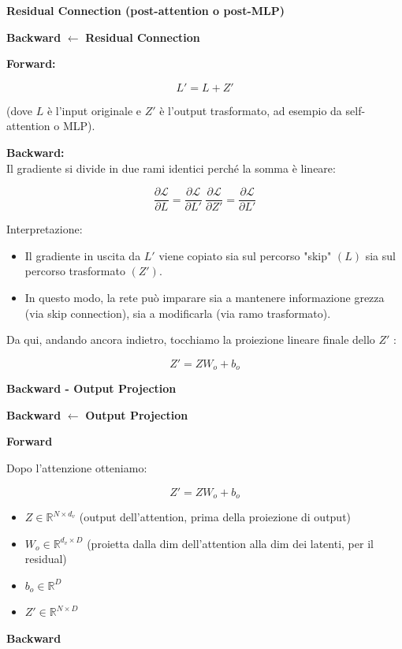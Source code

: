 \documentclass[
  11pt,
]{article}
\newcommand{\currentstep}[1]{%
\begin{tcolorbox}[colback=red!3, colframe=red!40!black, boxrule=0.3pt, arc=2pt,
  left=4pt, right=4pt, top=2pt, bottom=2pt]
{\footnotesize\textbf{Backward} $\longleftarrow$ \textbf{#1}}
\end{tcolorbox}}
\begin{document}
\textbf{Residual Connection (post-attention o post-MLP)}

\currentstep{Residual Connection}

\textbf{Forward:}

\[L' = L + Z'\]

(dove \(L\) è l'input originale e \(Z'\) è
l'output trasformato, ad esempio da self-attention o
MLP).

\textbf{Backward:}\\
Il gradiente si divide in due rami identici perché la somma è lineare:

\[\frac{\partial\mathcal{L}}{\partial L} = \frac{\partial\mathcal{L}}{\partial L'}\ \frac{\partial\mathcal{L}}{\partial Z'} = \frac{\partial\mathcal{L}}{\partial L'}\]

Interpretazione:

\begin{itemize}
\item
  Il gradiente in uscita da \(L'\) viene copiato sia sul percorso "skip"
  \((L)\) sia sul percorso trasformato \(\left( Z' \right)\).
\item
  In questo modo, la rete può imparare sia a mantenere informazione
  grezza (via skip connection), sia a modificarla (via ramo
  trasformato).
\end{itemize}

Da qui, andando ancora indietro, tocchiamo la proiezione lineare finale
dello \(Z'\) :

\[Z' = ZW_{o} + b_o\]

\textbf{Backward - Output Projection}

\currentstep{Output Projection}

\textbf{Forward}

Dopo l'attenzione otteniamo:

\[Z' = ZW_{o} + b_{o}\]

\begin{itemize}
\item
  \(Z \in \mathbb{R}^{N \times d_v}\) (output dell'attention, prima della proiezione di output)
\item
  \(W_{o} \in \mathbb{R}^{d_v \times D}\) (proietta dalla dim dell'attention alla dim dei latenti, per il residual)
\item
  \(b_{o} \in \mathbb{R}^{D}\)
\item
  \(Z' \in \mathbb{R}^{N \times D}\)
\end{itemize}

\textbf{Backward}
\end{document}
